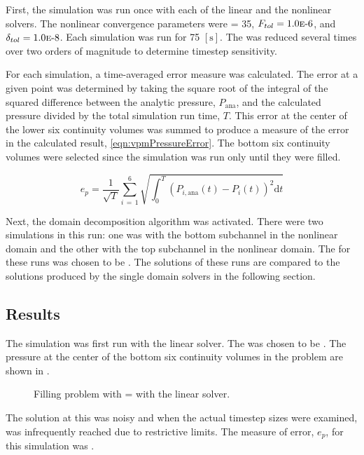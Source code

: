 First, the simulation was run once with each of the linear and the nonlinear solvers.
The nonlinear convergence parameters were \kmax{} = 35, $F_{tol} = \expneg{1.0}{6}$, and $\delta_{tol} = \expneg{1.0}{8}$. 
Each simulation was run for 75 $[ \text{s} ]$.
The \dtmax{} was reduced several times over two orders of magnitude to determine timestep sensitivity.

For each simulation, a time-averaged error measure was calculated.
The error at a given point was determined by taking the square root of the integral of the squared difference between the analytic pressure, $P_{\text{ana}}$, and the calculated pressure divided by the total simulation run time, $T$.
This error at the center of the lower six continuity volumes was summed to produce a measure of the error in the calculated result, \eqref{eqn:vpmPressureError}.
The bottom six continuity volumes were selected since the simulation was run only until they were filled.

\begin{equation}
\label{eqn:vpmPressureError}
e_{p} =  \frac{1}{\sqrt{T}} \sum_{i\,=\,1}^{6}\sqrt{\int_{0}^{T} \left(P_{i,\text{ana}}(t) - P_{i}(t)\right)^{2} \mathrm{d} t}
\end{equation}

Next, the domain decomposition algorithm was activated.
There were two simulations in this run: one was with the bottom subchannel in the nonlinear domain and the other with the top subchannel in the nonlinear domain.
The \dtmax{} for these runs was chosen to be .
The solutions of these runs are compared to the solutions produced by the single domain solvers in the following section.

\subsection{Results}
\label{subsect:vmpResults}

The simulation was first run with the linear solver.
The \dtmax{} was chosen to be .
The pressure at the center of the bottom six continuity volumes in the problem are shown in .

\begin{figure}[h!tb]
\centering

\caption{Filling problem with \dtmax{} =  with the linear solver.}
\label{fig:linFill1em1}
\end{figure}

The solution at this \dtmax{} was noisy and when the actual timestep sizes were examined, \dtmax{} was infrequently reached due to restrictive \dtcrnt{} limits.
The measure of error, $e_{p}$, for this simulation was .

